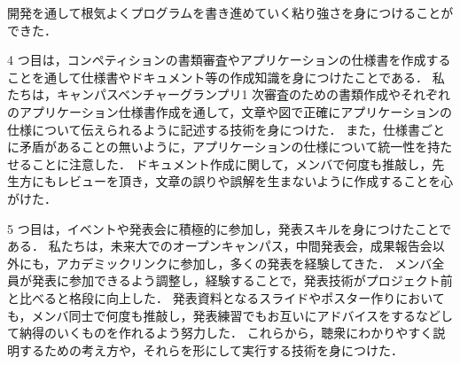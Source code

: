 開発を通して根気よくプログラムを書き進めていく粘り強さを身につけることができた．
\par
4 つ目は，コンペティションの書類審査やアプリケーションの仕様書を作成することを通して仕様書やドキュメント等の作成知識を身につけたことである．
私たちは，キャンパスベンチャーグランプリ1 次審査のための書類作成やそれぞれのアプリケーション仕様書作成を通して，文章や図で正確にアプリケーションの仕様について伝えられるように記述する技術を身につけた．
また，仕様書ごとに矛盾があることの無いように，アプリケーションの仕様について統一性を持たせることに注意した．
ドキュメント作成に関して，メンバで何度も推敲し，先生方にもレビューを頂き，文章の誤りや誤解を生まないように作成することを心がけた．
\par
5 つ目は，イベントや発表会に積極的に参加し，発表スキルを身につけたことである．
私たちは，未来大でのオープンキャンパス，中間発表会，成果報告会以外にも，アカデミックリンクに参加し，多くの発表を経験してきた．
メンバ全員が発表に参加できるよう調整し，経験することで，発表技術がプロジェクト前と比べると格段に向上した．
発表資料となるスライドやポスター作りにおいても，メンバ同士で何度も推敲し，発表練習でもお互いにアドバイスをするなどして納得のいくものを作れるよう努力した．
これらから，聴衆にわかりやすく説明するための考え方や，それらを形にして実行する技術を身につけた．
